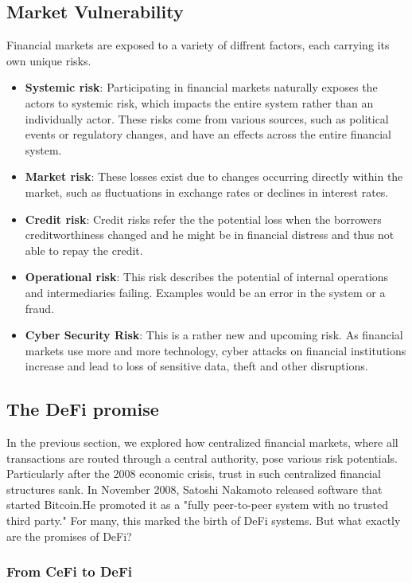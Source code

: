 \documentclass{article}
\begin{document}
\subsection{Market Vulnerability} 
Financial markets are exposed to a variety of diffrent factors, each carrying its own unique risks.
\begin{itemize}
    \item \textbf{Systemic risk}: Participating in financial markets naturally exposes the actors to systemic risk, which impacts the entire system rather than an individually actor. These risks come from various sources, such as political events or regulatory changes, and have an effects across the entire financial system.
    \item \textbf{Market risk}:  These losses exist due to changes occurring directly within the market, such as fluctuations in exchange rates or declines in interest rates.
     \item \textbf{Credit risk}:  Credit risks refer the the potential loss when the borrowers creditworthiness changed and he might be in financial distress and thus not able to repay the credit.
    \item \textbf{Operational risk}:  This risk describes the potential of internal operations and intermediaries failing. Examples would be an error in the system or a fraud.
    \item \textbf{Cyber Security Risk}: This is a rather new and upcoming risk. As financial markets use more and more technology, cyber attacks on financial institutions increase and lead to loss of sensitive data, theft and other disruptions. 
\end{itemize}


\subsection{The DeFi promise } 
In the previous section, we explored how centralized financial markets, where all transactions are routed through a central authority, pose various risk potentials. Particularly after the 2008 economic crisis, trust in such centralized financial structures sank. In November 2008, Satoshi Nakamoto released software that started Bitcoin.He promoted it as a "fully peer-to-peer system with no trusted third party." For many, this marked the birth of DeFi systems. But what exactly are the promises of DeFi?

\subsubsection{From CeFi to DeFi}
\end{document}
